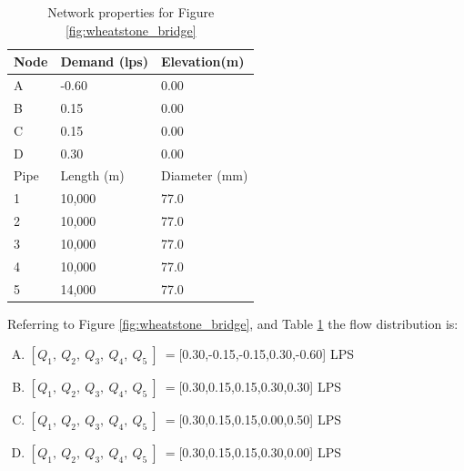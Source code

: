 \documentclass[11pt]{article}
\begin{document}
\begin{enumerate}
\begin{table}[h!]
   \centering
   \caption{Network properties for Figure \ref{fig:wheatstone_bridge}}
\begin{tabular}{lll}
\hline
Node&Demand (lps)&  Elevation(m) \\
\hline
A & -0.60 & 0.00 \\
B &  0.15   & 0.00 \\
C & 0.15 & 0.00 \\
D & 0.30 & 0.00 \\
\hline
Pipe& Length (m)&  Diameter (mm)\\
\hline
1 & 10,000 & 77.0 \\
2 & 10,000 & 77.0 \\
3 & 10,000 & 77.0 \\
4 & 10,000 & 77.0 \\
5 & 14,000 & 77.0 \\
\end{tabular}
\label{tab:wheatstone1}
\normalsize
\end{table}



Referring to Figure \ref{fig:wheatstone_bridge}, and Table \ref{tab:wheatstone1} the flow distribution is:
\begin{enumerate}[(A)]
\item $[Q_1,~Q_2,~Q_3,~Q_4,~Q_5~]~=$[0.30,-0.15,-0.15,0.30,-0.60] LPS
\item $[Q_1,~Q_2,~Q_3,~Q_4,~Q_5~]~=$[0.30,0.15,0.15,0.30,0.30] LPS
\item $[Q_1,~Q_2,~Q_3,~Q_4,~Q_5~]~=$[0.30,0.15,0.15,0.00,0.50] LPS
\item $[Q_1,~Q_2,~Q_3,~Q_4,~Q_5~]~=$[0.30,0.15,0.15,0.30,0.00] LPS
\end{enumerate}
\end{enumerate}
\end{document}

